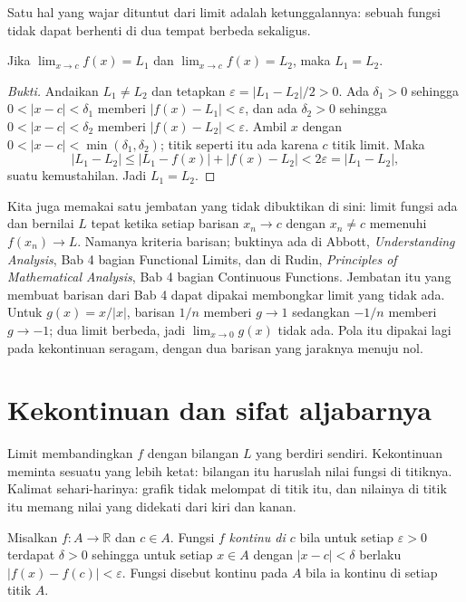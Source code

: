 Satu hal yang wajar dituntut dari limit adalah ketunggalannya: sebuah fungsi tidak
dapat berhenti di dua tempat berbeda sekaligus.

\begin{teorema}
Jika $\lim_{x\to c}f(x)=L_{1}$ dan $\lim_{x\to c}f(x)=L_{2}$, maka $L_{1}=L_{2}$.
\end{teorema}

\begin{proof}[Bukti]
Andaikan $L_{1}\neq L_{2}$ dan tetapkan $\varepsilon=|L_{1}-L_{2}|/2>0$. Ada
$\delta_{1}>0$ sehingga $0<|x-c|<\delta_{1}$ memberi $|f(x)-L_{1}|<\varepsilon$, dan
ada $\delta_{2}>0$ sehingga $0<|x-c|<\delta_{2}$ memberi $|f(x)-L_{2}|<\varepsilon$.
Ambil $x$ dengan $0<|x-c|<\min(\delta_{1},\delta_{2})$; titik seperti itu ada karena
$c$ titik limit. Maka
\[
|L_{1}-L_{2}|\le|L_{1}-f(x)|+|f(x)-L_{2}|<2\varepsilon=|L_{1}-L_{2}|,
\]
suatu kemustahilan. Jadi $L_{1}=L_{2}$.
\end{proof}

Kita juga memakai satu jembatan yang tidak dibuktikan di sini: limit fungsi ada dan
bernilai $L$ tepat ketika setiap barisan $x_{n}\to c$ dengan $x_{n}\neq c$ memenuhi
$f(x_{n})\to L$. Namanya kriteria barisan; buktinya ada di Abbott, \emph{Understanding
Analysis}, Bab 4 bagian Functional Limits, dan di Rudin, \emph{Principles of
Mathematical Analysis}, Bab 4 bagian Continuous Functions. Jembatan itu yang membuat
barisan dari Bab 4 dapat dipakai membongkar limit yang tidak ada. Untuk $g(x)=x/|x|$,
barisan $1/n$ memberi $g\to 1$ sedangkan $-1/n$ memberi $g\to -1$; dua limit berbeda,
jadi $\lim_{x\to 0}g(x)$ tidak ada. Pola itu dipakai lagi pada kekontinuan seragam,
dengan dua barisan yang jaraknya menuju nol.

\section{Kekontinuan dan sifat aljabarnya}

Limit membandingkan $f$ dengan bilangan $L$ yang berdiri sendiri. Kekontinuan meminta
sesuatu yang lebih ketat: bilangan itu haruslah nilai fungsi di titiknya. Kalimat
sehari-harinya: grafik tidak melompat di titik itu, dan nilainya di titik itu memang
nilai yang didekati dari kiri dan kanan.


\begin{definisi}
Misalkan $f\colon A\to\mathbb{R}$ dan $c\in A$. Fungsi $f$ \emph{kontinu di $c$} bila
untuk setiap $\varepsilon>0$ terdapat $\delta>0$ sehingga untuk setiap $x\in A$
dengan $|x-c|<\delta$ berlaku $|f(x)-f(c)|<\varepsilon$. Fungsi disebut kontinu pada
$A$ bila ia kontinu di setiap titik $A$.
\end{definisi}

